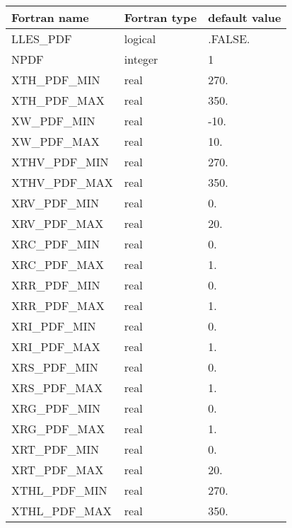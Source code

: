 \begin{center}
\begin{tabular} {|l|l|l|}
\hline
Fortran name & Fortran type & default value \\
\hline
LLES\_PDF                     & logical          & .FALSE.  \\
NPDF                          & integer           & 1 \\
XTH\_PDF\_MIN                 & real              & 270. \\
XTH\_PDF\_MAX                 & real              & 350. \\
XW\_PDF\_MIN                  & real              & -10. \\
XW\_PDF\_MAX                  & real              & 10. \\
XTHV\_PDF\_MIN                & real              & 270. \\
XTHV\_PDF\_MAX                & real              & 350. \\
XRV\_PDF\_MIN                 & real              & 0. \\
XRV\_PDF\_MAX                 & real              & 20. \\
XRC\_PDF\_MIN                 & real              & 0. \\
XRC\_PDF\_MAX                 & real              & 1. \\
XRR\_PDF\_MIN                 & real              & 0. \\
XRR\_PDF\_MAX                 & real              & 1. \\
XRI\_PDF\_MIN                 & real              & 0. \\
XRI\_PDF\_MAX                 & real              & 1. \\
XRS\_PDF\_MIN                 & real              & 0. \\
XRS\_PDF\_MAX                 & real              & 1. \\
XRG\_PDF\_MIN                 & real              & 0. \\
XRG\_PDF\_MAX                 & real              & 1. \\
XRT\_PDF\_MIN                 & real              & 0. \\
XRT\_PDF\_MAX                 & real              & 20. \\
XTHL\_PDF\_MIN                & real              & 270. \\
XTHL\_PDF\_MAX                & real              & 350. \\
\hline
\end{tabular}
\end{center}

